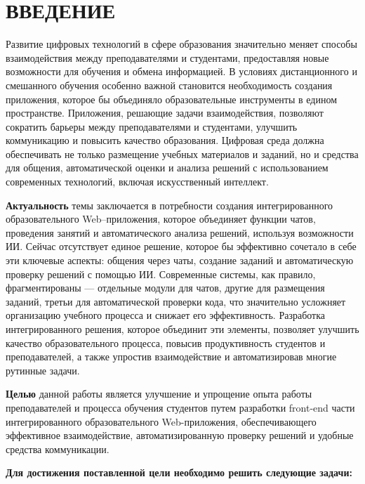 \newpage
{}
\section*{ВВЕДЕНИЕ}

Развитие цифровых технологий в сфере образования значительно меняет способы взаимодействия между преподавателями и студентами, предоставляя новые возможности для обучения и обмена информацией. В условиях дистанционного и смешанного обучения особенно важной становится необходимость создания приложения, которое бы объединяло образовательные инструменты в едином пространстве. Приложения, решающие задачи взаимодействия, позволяют сократить барьеры между преподавателями и студентами, улучшить коммуникацию и повысить качество образования. Цифровая среда должна обеспечивать не только размещение учебных материалов и заданий, но и средства для общения, автоматической оценки и анализа решений с использованием современных технологий, включая искусственный интеллект.

\textbf{Актуальность} темы заключается в потребности создания интегрированного образовательного Web–приложения, которое объединяет функции чатов, проведения занятий и автоматического анализа решений, используя возможности ИИ. Сейчас отсутствует единое решение, которое бы эффективно сочетало в себе эти ключевые аспекты: общения через чаты, создание заданий и автоматическую проверку решений с помощью ИИ. Современные системы, как правило, фрагментированы — отдельные модули для чатов, другие для размещения заданий, третьи для автоматической проверки кода, что значительно усложняет организацию учебного процесса и снижает его эффективность. Разработка интегрированного решения, которое объединит эти элементы, позволяет улучшить качество образовательного процесса, повысив продуктивность студентов и преподавателей, а также упростив взаимодействие и автоматизировав многие рутинные задачи.

\textbf{Целью} данной работы является улучшение и упрощение опыта работы преподавателей и процесса обучения студентов путем разработки front-end части интегрированного образовательного Web-приложения, обеспечивающего эффективное взаимодействие, автоматизированную проверку решений и удобные средства коммуникации.

\textbf{Для достижения поставленной цели необходимо решить следующие задачи:}

